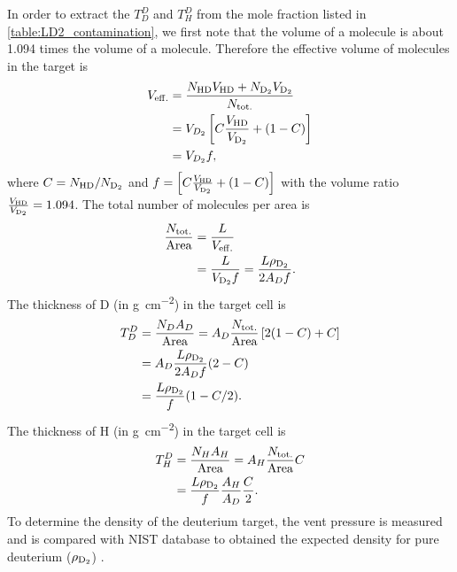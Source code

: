 \documentclass[../main.tex]{subfiles}
\begin{document}
In order to extract the $T_D^D$ and $T^D_H$ from the mole fraction listed in \cref{table:LD2_contamination},
we first note that the volume of a  molecule is about \num{1.094} times the volume of a 
molecule. Therefore the effective volume of molecules in the target is
\begin{equation}
	\begin{split}
		V_{\mathrm{eff.}}&=\frac{N_{\ce{HD}} V_{\ce{HD}} + N_{\ce{D_2}} V_{\ce{D_2}}}{N_{\text{tot.}}}\\
		&=V_{D_2} \left[ C \frac{V_{\ce{HD}}}{V_{\ce{D_2}}} + (1-C) \right]\\
		&=V_{D_2} f,
	\end{split}
\end{equation}
where $C=N_{\ce{HD}}/N_{\ce{D_2}}$ and $f=\left[ C \frac{V_{\ce{HD}}}{V_{\ce{D_2}}} + (1-C) \right]$ with the
volume ratio $\frac{V_{\ce{HD}}}{V_{\ce{D_2}}}=1.094$.
The total number of molecules per area is
\begin{equation}
	\begin{split}
		\frac{N_{\mathrm{tot.}}}{\mathrm{Area}} &= \frac{L}{V_{\mathrm{eff.}}}\\
		&= \frac{L}{V_{\ce{D_2}}f}=\frac{L\rho_{\ce{D_2}}}{2A_Df}.
	\end{split}
\end{equation}
The thickness of D (in \unit{\g\per\cm\squared}) in the target cell is
\begin{equation}
	\begin{split}
		T_D^D &= \frac{N_D A_D}{\mathrm{Area}} = A_D\frac{N_{\mathrm{tot.}}}{\mathrm{Area}} \left[ 2(1-C) + C \right]\\
		&=A_D \frac{L\rho_{\ce{D_2}}}{2A_Df}(2-C)\\
		&=\frac{L\rho_{\ce{D_2}}}{f}(1-C/2).
	\end{split}
\end{equation}
The thickness of H (in \unit{\g\per\cm\squared}) in the target cell is
\begin{equation}
	\begin{split}
		T^D_H &= \frac{N_H A_H}{\mathrm{Area}} = A_H\frac{N_{\mathrm{tot.}}}{\mathrm{Area}}C\\
		&=\frac{L\rho_{\ce{D_2}}}{f}\frac{A_H}{A_D}\frac{C}{2}.
	\end{split}
	\label{eq:TDH}
\end{equation}
To determine the density of the deuterium target, the vent pressure is measured and is compared
with NIST database to obtained the expected density for pure deuterium ($\rho_{\ce{D_2}}$) \cite{density-1453}.
\end{document}
